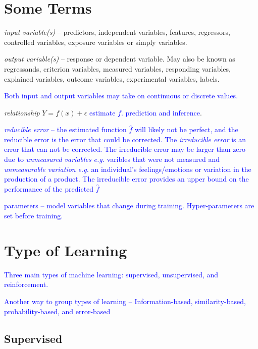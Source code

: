 \section{Some Terms}

\emph{input variable(s)} -- predictors, independent variables, features, regressors, controlled variables, exposure variables or simply variables.
 
\emph{output variable(s)} -- response or dependent variable. May also be known as regressands, criterion variables, measured variables, responding variables, explained variables, outcome variables, experimental variables, labels.

\textcolor{blue}{Both input and output variables may take on continuous or discrete values.}

\emph{relationship} $Y = f(x) + \epsilon$ \textcolor{blue}{estimate $f$. prediction and inference}.

\textcolor{blue}{\emph{{reducible error}} -- the estimated function $\hat{f}$ will likely not be perfect, and the reducible error is the error that could be corrected.  The \emph{irreducible error} is an error that can not be corrected. The irreducible error may be larger than zero due to \emph{unmeasured variables} \emph{e.g.} varibles that were not measured and \emph{unmeasurable variation} \emph{e.g.} an individual's feelings/emotions or variation in the production of a product. The irreducible error provides an upper bound on the performance of the predicted $\hat{f}$}

\textcolor{blue}{parameters -- model variables that change during training. Hyper-parameters are set before training.}

\section{Type of Learning}

\textcolor{blue}{Three main types of machine learning: supervised, unsupervised, and reinforcement.}

\textcolor{blue}{Another way to group types of learning -- Information-based, similarity-based, probability-based, and error-based}

\subsection{Supervised}

